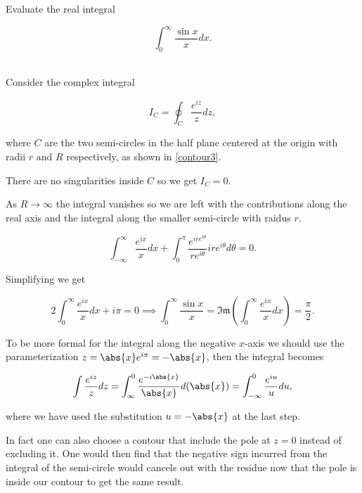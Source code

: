 \documentclass[english,a4paper,12pt]{report}
\begin{document}
{Evaluate the real integral 

\begin{equation}
    \int_{0}^{\infty}  \frac{\sin x}{x}dx.  
\end{equation}
~
}
{Consider the complex integral 

\begin{equation}
    I_{C} = \oint_{C} \frac{e^{iz} }{z}dz,
\end{equation}

where \(C\) are the two semi-circles in the half plane centered at the origin with radii \(r \text { and } R\) respectively, as shown in \cref{contour3}.  

There are no singularities inside \(C\) so we get \(I_{C} = 0\). 

As \(R \to \infty\) the integral vanishes so we are left with the contributions along the real axis and the integral along the smaller semi-circle with raidus \(r\).

\begin{equation}
    \int_{-\infty}^{\infty} \frac{e^{ix} }{x}dx + \int_{0}^{\pi } \frac{e^{i re^{i \theta } } }{re^{i \theta } } ir e^{i \theta }d \theta = 0.    
\end{equation}

Simplifying we get 

\begin{equation}
    2 \int_{0}^{\infty} \frac{e^{ix} }{x}dx + i \pi = 0 \implies \int_{0}^{\infty} \frac{\sin x}{x} = \mathfrak{Im} \left( \int_{0}^{\infty} \frac{e^{ix} }{x}dx   \right) = \frac{\pi }{2}.    
\end{equation}

To be more formal for the integral along the negative \(x\)-axis we should use the parameterization \(z = \abs{x}e^{i\pi } = -\abs{x}   \), then the integral becomes

\begin{equation}
    \int \frac{e^{iz} }{z} dz = \int_{\infty}^{0} \frac{e^{-i \abs{x} } }{\abs{x} } d(\abs{x} ) = \int_{-\infty}^{0} \frac{e^{iu} }{u}du,    
\end{equation}

where we have used the substitution \(u = -\abs{x} \) at the last step. 

In fact one can also choose a contour that include the pole at \(z = 0\) instead of excluding it. One would then find that the negative sign incurred from the integral of the semi-circle would cancels out with the residue now that the pole is inside our contour to get the same result. 
} 
\end{document}
